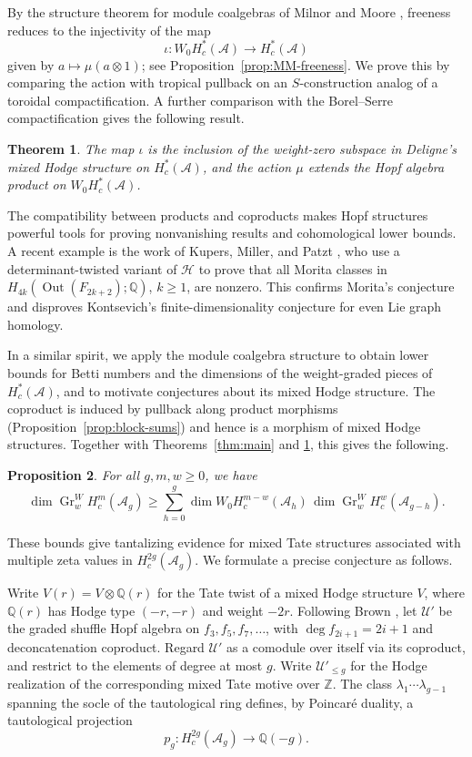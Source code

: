 \documentclass[12 pt]{amsart}
\newcommand{\QQ}{\mathbb{Q}}
\newcommand{\ZZ}{\mathbb{Z}}
\newcommand{\cA}{\mathcal{A}}
\newcommand{\cH}{\mathcal{H}}
\newcommand{\cU}{\mathcal{U}}
\newcommand{\Gr}{\operatorname{Gr}}
\newcommand{\<}{\langle}
\renewcommand{\>}{\rangle}
\newtheorem{theorem}{Theorem}[section]
\newtheorem{proposition}[theorem]{Proposition}
\theoremstyle{definition}
\begin{document}
By the structure theorem for module coalgebras of Milnor and Moore \cite[Theorem~4.4]{MilnorMoore}, freeness reduces to the injectivity of the map
\[
\iota \colon W_0H^*_c(\cA) \to H^*_c(\cA)
\]
given by $a \mapsto \mu(a \otimes 1)$; see Proposition~\ref{prop:MM-freeness}. We prove this by comparing the action with tropical pullback on an $S$-construction analog of a toroidal compactification. A further comparison with the Borel--Serre compactification gives the following result.

\begin{theorem}\label{thm:iota-weight-zero}
The map $\iota$ is the inclusion of the weight-zero subspace in Deligne's mixed Hodge structure on $H_c^*(\cA)$, and the action $\mu$ extends the Hopf algebra product on $W_0 H_c^*(\cA)$.
\end{theorem}

The compatibility between products and coproducts makes Hopf structures powerful tools for proving nonvanishing results and cohomological lower bounds. A recent example is the work of Kupers, Miller, and Patzt \cite[Theorem~A and Corollary~C]{KupersMillerPatzt26}, who use a determinant-twisted variant of $\cH$ to prove that all Morita classes in $H_{4k}(\operatorname{Out}(F_{2k + 2}); \QQ)$, $k \geq 1$, are nonzero. This confirms Morita's conjecture and disproves Kontsevich's finite-dimensionality conjecture for even Lie graph homology.

In a similar spirit, we apply the module coalgebra structure to obtain lower bounds for Betti numbers and the dimensions of the weight-graded pieces of $H_c^*(\cA)$, and to motivate conjectures about its mixed Hodge structure. The coproduct is induced by pullback along product morphisms (Proposition~\ref{prop:block-sums}) and hence is a morphism of mixed Hodge structures. Together with Theorems~\ref{thm:main} and \ref{thm:iota-weight-zero}, this gives the following.

\begin{proposition}\label{prop:weight-convolution}
For all $g, m, w \geq 0$, we have
\[
\dim \Gr_w^W H_c^m(\cA_g) \geq \sum_{h = 0}^g \dim W_0 H_c^{m - w}(\cA_h) \, \dim \Gr_w^W H_c^w(\cA_{g - h}).
\]
\end{proposition}

\noindent These bounds give tantalizing evidence for mixed Tate structures associated with multiple zeta values in $H_c^{2g}(\cA_g)$. We formulate a precise conjecture as follows.

Write $V(r) = V \otimes \QQ(r)$ for the Tate twist of a mixed Hodge structure $V$, where $\QQ(r)$ has Hodge type $(-r, -r)$ and weight $-2r$. Following Brown \cite[\S3.1]{BrownDecomposition}, let $\cU'$ be the graded shuffle Hopf algebra on $f_3, f_5, f_7, \ldots$, with $\deg f_{2i + 1} = 2i + 1$ and deconcatenation coproduct. Regard $\cU'$ as a comodule over itself via its coproduct, and restrict to the elements of degree at most $g$. Write $\cU'_{\leq g}$ for the Hodge realization of the corresponding mixed Tate motive over $\ZZ$. The class $\lambda_1 \cdots \lambda_{g - 1}$ spanning the socle of the tautological ring defines, by Poincar\'e duality, a tautological projection
\[
p_g \colon H_c^{2g}(\cA_g) \longrightarrow \QQ(-g).
\]
\end{document}
